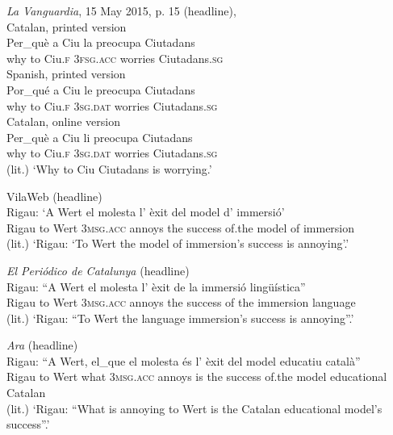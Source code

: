 \documentclass[output=paper,colorlinks,citecolor=brown,modfonts,nonflat]{langsci/langscibook}
\begin{document}
\ea%
 \emph{La} \emph{Vanguardia}, 15 May 2015, p. 15 (headline),
 \label{ex:royo:5}\\
 \ea Catalan, printed version \label{ex:royo:5a}\\
 \gll Per\_què a Ciu la preocupa Ciutadans \\
why      to Ciu.\textsc{f} 3\textsc{fsg.acc} worries   Ciutadans.\textsc{sg} \\


 \ex Spanish, printed version \label{ex:royo:5b}\\
 \gll Por\_qué a Ciu le preocupa Ciutadans\\
why      to Ciu.\textsc{f} \textsc{3sg.dat} worries    Ciutadans.\textsc{sg}\\


\ex Catalan, online version \label{ex:royo:5c}\\
 \gll Per\_què a Ciu li preocupa Ciutadans \\
	why      to Ciu.\textsc{f} 3\textsc{sg.dat} worries    Ciutadans.\textsc{sg}\\
 \glt (lit.) ‘Why to Ciu Ciutadans is worrying.’

 \z
 \z


\ea%
 \label{ex:royo:6}
 \ea VilaWeb (headline)\\
 \gll Rigau: ‘A Wert el molesta l’ èxit del model d’ immersió’\\
Rigau   to Wert \textsc{3msg.acc} annoys   the success of.the model of immersion\\
 \glt (lit.) ‘Rigau: ‘To Wert the model of immersion’s success is annoying’.’

 \ex \textit{El Periódico de Catalunya} (headline)\\
 \gll Rigau: “A Wert el molesta l’ èxit de la immersió lingüística”\\
 Rigau   to Wert 3\textsc{msg.acc} annoys  the success of the immersion language\\
 \glt (lit.) ‘Rigau: “To Wert the language immersion’s success is annoying”.’

 \ex \textit{Ara} (headline)\\
 \gll Rigau: “A Wert, el\_que el molesta és l’ èxit del model educatiu català”\\
Rigau    to Wert what   \textsc{3msg.acc} annoys  is the success of.the model educational Catalan\\
 \glt (lit.) ‘Rigau: “What is annoying to Wert is the Catalan educational model’s success”.’
 \z
 \z
{}
\end{document}
